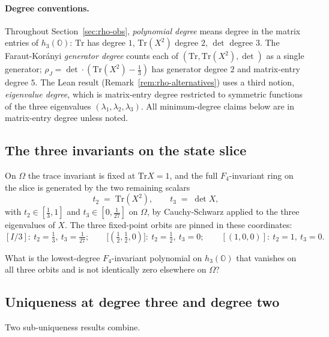 \documentclass[12pt]{article}
\theoremstyle{remark}
\newcommand{\hthree}{h_3(\mathbb{O})}
\newcommand{\Ffour}{F_4}
\newcommand{\rhoJ}{\rho_J}
\newcommand{\Tr}{\mathrm{Tr}}
\begin{document}
\paragraph{Degree conventions.} Throughout Section~\ref{sec:rho-obs},
\emph{polynomial degree} means degree in the matrix entries of
$\hthree$: $\Tr$ has degree $1$, $\Tr(X^2)$ degree $2$, $\det$ degree
$3$. The Faraut-Kor\'anyi \emph{generator degree} counts each of
$(\Tr, \Tr(X^2), \det)$ as a single generator; $\rhoJ = \det \cdot
(\Tr(X^2) - \tfrac{1}{3})$ has generator degree $2$ and matrix-entry
degree $5$. The Lean result (Remark~\ref{rem:rho-alternatives}) uses
a third notion, \emph{eigenvalue degree}, which is matrix-entry
degree restricted to symmetric functions of the three eigenvalues
$(\lambda_1, \lambda_2, \lambda_3)$. All minimum-degree claims below
are in matrix-entry degree unless noted.

\subsection{The three invariants on the state slice}
\label{sec:FK-slice}

On $\Omega$ the trace invariant is fixed at $\Tr X = 1$, and the full
$\Ffour$-invariant ring on the slice is generated by the two remaining
scalars
\begin{equation}\label{eq:slice-invariants}
  t_2 \;=\; \Tr(X^2), \qquad t_3 \;=\; \det X,
\end{equation}
with $t_2 \in [\tfrac{1}{3}, 1]$ and $t_3 \in [0, \tfrac{1}{27}]$ on
$\Omega$, by Cauchy-Schwarz applied to the three eigenvalues of $X$. The
three fixed-point orbits are pinned in these coordinates:
\begin{equation}\label{eq:fixed-points}
  [I/3]: \ t_2 = \tfrac{1}{3},\ t_3 = \tfrac{1}{27}; \qquad
  \bigl[(\tfrac{1}{2}, \tfrac{1}{2}, 0)\bigr]: \ t_2 = \tfrac{1}{2},\ t_3 = 0; \qquad
  [(1, 0, 0)]: \ t_2 = 1,\ t_3 = 0.
\end{equation}

What is the lowest-degree $\Ffour$-invariant polynomial on
$\hthree$ that vanishes on all three orbits and is not identically
zero elsewhere on $\Omega$?

\subsection{Uniqueness at degree three and degree two}
\label{sec:rho-uniqueness}

Two sub-uniqueness results combine.
\end{document}
